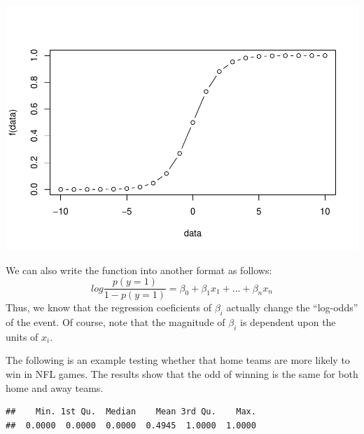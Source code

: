 \documentclass[]{book}
\newenvironment{Shaded}{\begin{snugshade}}{\end{snugshade}}
\newcommand{\DecValTok}[1]{\textcolor[rgb]{0.00,0.00,0.81}{#1}}
\newcommand{\KeywordTok}[1]{\textcolor[rgb]{0.13,0.29,0.53}{\textbf{#1}}}
\newcommand{\NormalTok}[1]{#1}
\newcommand{\OperatorTok}[1]{\textcolor[rgb]{0.81,0.36,0.00}{\textbf{#1}}}
\newcommand{\StringTok}[1]{\textcolor[rgb]{0.31,0.60,0.02}{#1}}
\begin{document}
\includegraphics{bookdown-demo_files/figure-latex/unnamed-chunk-1-1.pdf}

We can also write the function into another format as follows:
\[log \frac{p(y=1)}{1-p(y=1)}= \beta_0+\beta_1x_1+...+\beta_nx_n\]
Thus, we know that the regression coeficients of \(\beta_i\) actually change the ``log-odds'' of the event. Of course, note that the magnitude of \(\beta_i\) is dependent upon the units of \(x_i\).

The following is an example testing whether that home teams are more likely to win in NFL games. The results show that the odd of winning is the same for both home and away teams.

\begin{Shaded}
\end{Shaded}

\begin{verbatim}
##    Min. 1st Qu.  Median    Mean 3rd Qu.    Max. 
##  0.0000  0.0000  0.0000  0.4945  1.0000  1.0000
\end{verbatim}
\end{document}
